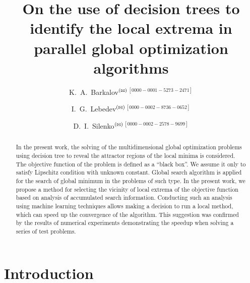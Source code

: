 \documentclass{svproc}
\def\orcidID#1{\unskip$^{[#1]}$}
\def\letter{$^{\textrm{(\Letter)}}$}
\begin{document}
\mainmatter              %
%
\title{On the use of decision trees to identify the local extrema in parallel global optimization algorithms}
%
%
\author{K.~A.~Barkalov\letter\orcidID{0000-0001-5273-2471} \and I.~G.~Lebedev\letter\orcidID{0000-0002-8736-0652} \and D.~I.~Silenko\letter\orcidID{0000-0002-2578-9699}}
%
%
%

\maketitle              %

\begin{abstract}
In the present work, the solving of the multidimensional global optimization problems using decision tree to reveal the attractor regions of the local minima is considered. The objective function of the  problem is defined as a ``black box''.  We assume it only to satisfy Lipschitz condition with unknown constant.  Global search algorithm is applied for the search of global minimum in the problems of such type. In the present work, we propose a method for selecting the vicinity of local extrema of the objective  function based on analysis of accumulated search information. Conducting such an analysis using machine learning techniques allows making a decision to run a local  method, which can speed up the convergence of the algorithm.  This suggestion was confirmed by the results of numerical experiments demonstrating the speedup  when solving a series of test problems.
\end{abstract}
%

\section{Introduction}
\end{document}
